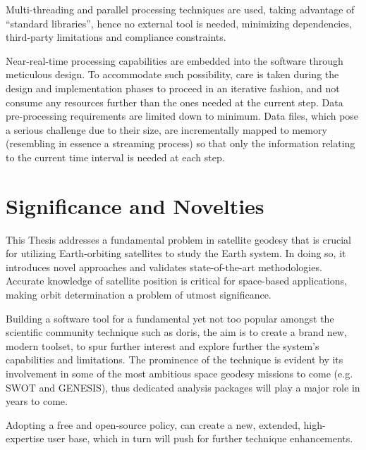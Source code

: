 Multi-threading and parallel processing techniques are used, taking advantage of 
``standard libraries'', hence no external tool is needed, minimizing dependencies, 
third-party limitations and compliance constraints.

Near-real-time processing capabilities are embedded into the software through 
meticulous design. To accommodate such possibility, care is taken during the 
design and implementation phases to proceed in an iterative fashion, and not 
consume any resources further than the ones needed at the current step. Data 
pre-processing requirements are limited down to minimum. Data files, which pose a 
serious challenge due to their size, are incrementally mapped to memory (resembling 
in essence a streaming process) so that only the information relating to the 
current time interval is needed at each step.

\section{Significance and Novelties}\label{ssec:significance-and-novelty}
\iffalse
This Thesis touches upon a fundamental problem of satellite geodesy, one that sits 
in the core of using Earth orbiting satellites to study the Earth system, introducing 
on the way novel approaches, and validating state-of-the-art methodologies.
Since, accurate knowledge of satellite position is an essential and imperative need 
for space based application, orbit determination is a problem of utmost significance. 
\fi
This Thesis addresses a fundamental problem in satellite geodesy that is crucial
for utilizing Earth-orbiting satellites to study the Earth system. In doing so, it
introduces novel approaches and validates state-of-the-art methodologies. Accurate
knowledge of satellite position is critical for space-based applications, making
orbit determination a problem of utmost significance.

Building a software tool for a fundamental yet not too popular amongst the 
scientific community technique such as \gls{doris}, the aim is to create a brand new, 
modern toolset, to spur further interest and explore further the system's 
capabilities and limitations. The prominence of the technique is evident by its 
involvement in some of the most ambitious space geodesy missions to come (e.g. 
SWOT and GENESIS), thus dedicated analysis packages will play a major role in 
years to come.

Adopting a free and open-source policy, can create a new, extended, high-expertise 
user base, which in turn will push for further technique enhancements.

